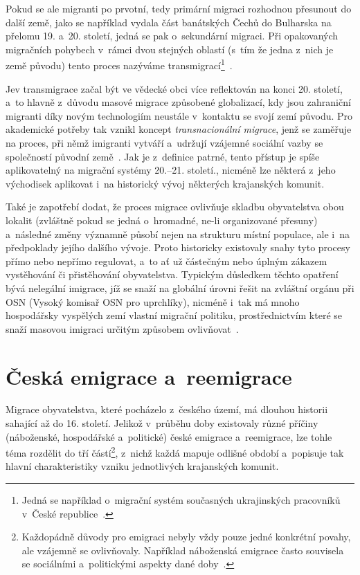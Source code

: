 Pokud se ale migranti po prvotní, tedy primární migraci rozhodnou přesunout do další země, jako se například vydala část banátských Čechů do Bulharska na přelomu 19. a~20. století, jedná se pak o~sekundární migraci. Při opakovaných migračních pohybech v~rámci dvou stejných oblastí (s~tím že jedna z~nich je země původu) tento proces nazýváme transmigrací\footnote{Jedná se například o~migrační systém současných ukrajinských pracovníků v~České republice~\parencite{Nespor2005}.}~\parencite{Nespor2005}.

Jev transmigrace začal být ve vědecké obci více reflektován na konci 20. století, a~to hlavně z~důvodu masové migrace způsobené globalizací, kdy jsou zahraniční migranti díky novým technologiím neustále v~kontaktu se svojí zemí původu. Pro akademické potřeby tak vznikl koncept \emph{transnacionální migrace}, jenž se zaměřuje na proces, při němž imigranti vytváří a~udržují vzájemné sociální vazby se společností původní země~\parencite{Kralova2013}. Jak je z~definice patrné, tento přístup je spíše aplikovatelný na migrační systémy 20.--21. století., nicméně lze některá z~jeho východisek aplikovat i~na historický vývoj některých krajanských komunit.

Také je zapotřebí dodat, že proces migrace ovlivňuje skladbu obyvatelstva obou lokalit (zvláštně pokud se jedná o~hromadné, ne-li organizované přesuny) a~následné změny významně působí nejen na strukturu místní populace, ale i~na předpoklady jejího dalšího vývoje. Proto historicky existovaly snahy tyto procesy přímo nebo nepřímo regulovat, a~to ať už částečným nebo úplným zákazem vystěhování či přistěhování obyvatelstva. Typickým důsledkem těchto opatření bývá nelegální imigrace, jíž se snaží na globální úrovni řešit na zvláštní orgánu při OSN (Vysoký komisař OSN pro uprchlíky), nicméně i~tak má mnoho hospodářsky vyspělých zemí vlastní migrační politiku, prostřednictvím které se snaží masovou imigraci určitým způsobem ovlivňovat~\parencite{Fialova2017a}.

\hypertarget{ux10deskuxe1-emigrace-a-reemigrace}{%
\section{Česká emigrace a~reemigrace}\label{ux10deskuxe1-emigrace-a-reemigrace}}

Migrace obyvatelstva, které pocházelo z~českého území, má dlouhou historii sahající až do 16. století. Jelikož v~průběhu doby existovaly různé příčiny (náboženské, hospodářské a~politické) české emigrace a~reemigrace, lze tohle téma rozdělit do tří částí\footnote{Každopádně důvody pro emigraci nebyly vždy pouze jedné konkrétní povahy, ale vzájemně se ovlivňovaly. Například náboženská emigrace často souvisela se sociálními a~politickými aspekty dané doby~\parencite{Vaculik2009a}.}, z~nichž každá mapuje odlišné období a~popisuje tak hlavní charakteristiky vzniku jednotlivých krajanských komunit.

